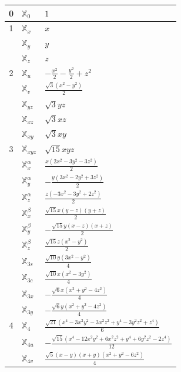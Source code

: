 \documentclass[fleqn,9pt,landscape]{jsarticle}
\begin{document}
\begin{longtable}{cll}
0 & $\mathbb{X}_{0}$ & $1$ \\ \hline
1 & $\mathbb{X}_{x}$ & $x$ \\
 & $\mathbb{X}_{y}$ & $y$ \\
 & $\mathbb{X}_{z}$ & $z$ \\ \hline
2 & $\mathbb{X}_{u}$ & $- \frac{x^{2}}{2} - \frac{y^{2}}{2} + z^{2}$ \\
 & $\mathbb{X}_{v}$ & $\frac{\sqrt{3} \left(x^{2} - y^{2}\right)}{2}$ \\
 & $\mathbb{X}_{yz}$ & $\sqrt{3} y z$ \\
 & $\mathbb{X}_{xz}$ & $\sqrt{3} x z$ \\
 & $\mathbb{X}_{xy}$ & $\sqrt{3} x y$ \\ \hline
3 & $\mathbb{X}_{xyz}$ & $\sqrt{15} x y z$ \\
 & $\mathbb{X}_{x}^{\alpha}$ & $\frac{x \left(2 x^{2} - 3 y^{2} - 3 z^{2}\right)}{2}$ \\
 & $\mathbb{X}_{y}^{\alpha}$ & $- \frac{y \left(3 x^{2} - 2 y^{2} + 3 z^{2}\right)}{2}$ \\
 & $\mathbb{X}_{z}^{\alpha}$ & $\frac{z \left(- 3 x^{2} - 3 y^{2} + 2 z^{2}\right)}{2}$ \\
 & $\mathbb{X}_{x}^{\beta}$ & $\frac{\sqrt{15} x \left(y - z\right) \left(y + z\right)}{2}$ \\
 & $\mathbb{X}_{y}^{\beta}$ & $- \frac{\sqrt{15} y \left(x - z\right) \left(x + z\right)}{2}$ \\
 & $\mathbb{X}_{z}^{\beta}$ & $\frac{\sqrt{15} z \left(x^{2} - y^{2}\right)}{2}$ \\
 & $\mathbb{X}_{3s}$ & $\frac{\sqrt{10} y \left(3 x^{2} - y^{2}\right)}{4}$ \\
 & $\mathbb{X}_{3c}$ & $\frac{\sqrt{10} x \left(x^{2} - 3 y^{2}\right)}{4}$ \\
 & $\mathbb{X}_{3x}$ & $- \frac{\sqrt{6} x \left(x^{2} + y^{2} - 4 z^{2}\right)}{4}$ \\
 & $\mathbb{X}_{3y}$ & $- \frac{\sqrt{6} y \left(x^{2} + y^{2} - 4 z^{2}\right)}{4}$ \\ \hline
4 & $\mathbb{X}_{4}$ & $\frac{\sqrt{21} \left(x^{4} - 3 x^{2} y^{2} - 3 x^{2} z^{2} + y^{4} - 3 y^{2} z^{2} + z^{4}\right)}{6}$ \\
 & $\mathbb{X}_{4u}$ & $- \frac{\sqrt{15} \left(x^{4} - 12 x^{2} y^{2} + 6 x^{2} z^{2} + y^{4} + 6 y^{2} z^{2} - 2 z^{4}\right)}{12}$ \\
 & $\mathbb{X}_{4v}$ & $\frac{\sqrt{5} \left(x - y\right) \left(x + y\right) \left(x^{2} + y^{2} - 6 z^{2}\right)}{4}$ \\

\end{longtable}
\end{document}
